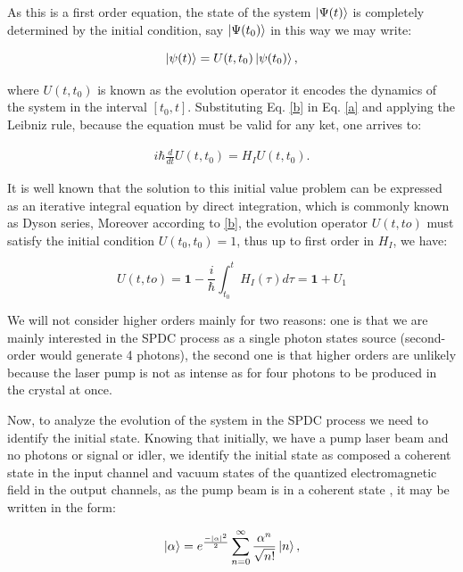 \documentclass{book}
\begin{document}
As this is a first order equation, the state of the system $\ket{\Psi(t)}$ is completely determined by the initial condition, say $\ket{\Psi(t_{0})}$ in this way we may write:

\begin{equation}
    \ket{\psi(t)}=U(t,t_{0})\ket{\psi(t_{0})},
\label{b}
\end{equation}

where $U(t,t_{0})$ is known as the evolution operator it encodes the dynamics of the system in the interval $[t_{0},t]$. Substituting Eq. \ref{b} in Eq. \ref{a} and applying the Leibniz rule, because the equation must be valid for any ket, one arrives to:

\begin{align}
i \hbar \frac{d}{dt}U(t,t_{0})=H_{I}U(t,t_{0}).
\end{align}

It is well known that the solution to this initial value problem can be expressed  as an iterative integral equation by direct integration,  which is commonly known as Dyson series, Moreover according to \ref{b}, the evolution operator $U(t,to)$ must satisfy the initial condition $U(t_{0},t_{0})=1$, thus up to first order in $H_{I}$, we have:

\begin{equation}
U(t,to)=\mathbf{1}-\frac{i}{\hbar} \int_{t_{0}}^{t} H_{I} (\tau) d\tau=\mathbf{1}+U_{1}
\end{equation}

We will not consider higher orders mainly for two reasons: one is that we are mainly interested in the SPDC process as a single photon states source (second-order would generate 4 photons), the second one is that higher orders are unlikely because the laser pump is not as intense as for four photons to be produced in the crystal at once.

Now, to analyze the evolution of the system in the SPDC process we need to identify the initial state. Knowing that initially, we have a pump  laser beam  and no photons or signal or idler, we identify the initial state as composed a coherent state in the input channel and vacuum states of the quantized electromagnetic field in the output channels, as the pump beam is in a coherent state \cite{leonhardt}, it may be written in the form:

\begin{equation}
\ket{\alpha}=e^{\frac{-|\alpha|^{2}}{2}} \sum_{n=0}^{\infty} \frac{\alpha^{n}}{\sqrt{n!}} \ket{n},
\end{equation}
\end{document}
